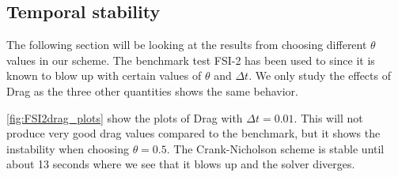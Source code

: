 \subsection{Temporal stability}
The following section will be looking at the results from choosing different $\theta$ values in our scheme. The benchmark test FSI-2 has been used to since it is known to blow up with certain values of $\theta$ and $\Delta t$. We only study the effects of Drag as the three other quantities shows the same behavior.   

\ref{fig:FSI2drag_plots} show the plots of Drag with $\Delta t = 0.01$. This will not produce very good drag values compared to the benchmark, but it shows the instability when choosing $\theta = 0.5$. The Crank-Nicholson scheme is stable until about 13 seconds where we see that it blows up and the solver diverges.
